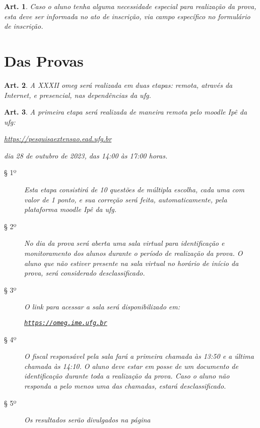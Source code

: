 \documentclass[a4paper,12pt]{article}
\newtheorem{article}{Art.}
\def\url{https://omeg.ime.ufg.br}
\def\homepage{\href{\url}{\texttt{\url}}}
\def\moodleufg{https://pesquisaextensao.ead.ufg.br}
\def\currentEdition{XXXII}
\def\year{2023}
\def\phaseOne{28 de outubro de \year}
\begin{document}
\begin{article}
  Caso o aluno tenha alguma necessidade especial para realização da prova,
  esta deve ser informada no ato de inscrição, via campo específico no
  formulário de inscrição.
\end{article}

\section*{Das Provas}

\begin{article}
  A \currentEdition{} \acrshort{omeg} será realizada em duas etapas: remota,
  através da Internet, e presencial, nas dependências da \acrshort{ufg}.
\end{article}

\begin{article}
  A primeira etapa será realizada de maneira remota pelo \acrshort{moodle} Ipê
  da \acrshort{ufg}:
  \begin{center}
    \href{\moodleufg}{\moodleufg}
  \end{center}
  dia \phaseOne, das 14:00 às 17:00 horas.
  \begin{description}
    \item[§ 1º]
      Esta etapa consistirá de 10 questões de múltipla escolha, cada uma com
      valor de 1 ponto, e sua correção será feita, automaticamente, pela
      plataforma \acrshort{moodle} Ipê da \acrshort{ufg}.
    \item[§ 2º]
      No dia da prova será aberta uma sala virtual para identificação e
      monitoramento dos alunos durante o período de realização da prova. O
      aluno que não estiver presente na sala virtual no horário de início da
      prova, será considerado desclassificado.
    \item[§ 3º]
      O link para acessar a sala será disponibilizado em:
      \begin{center}
        \homepage
      \end{center}
    \item[§ 4º]
      O fiscal responsável pela sala fará a primeira chamada às 13:50 e a
      última chamada às 14:10. O aluno deve estar em posse de um documento de
      identificação durante toda a realização da prova. Caso o aluno não
      responda a pelo menos uma das chamadas, estará desclassificado.
    \item[§ 5º]
      Os resultados serão divulgados na página
      \begin{center}

\end{center}
\end{description}
\end{article}
\end{document}
